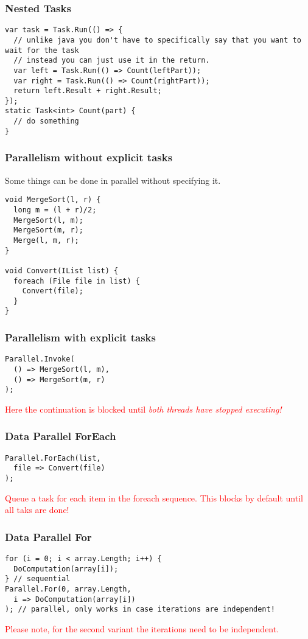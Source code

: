 \documentclass[main.tex,fontsize=8pt,paper=a4,paper=portrait,DIV=calc,]{scrartcl}
\begin{document}
\subsubsection{Nested Tasks}
\begin{lstlisting}
var task = Task.Run(() => {
  // unlike java you don't have to specifically say that you want to wait for the task
  // instead you can just use it in the return.
  var left = Task.Run(() => Count(leftPart));
  var right = Task.Run(() => Count(rightPart));
  return left.Result + right.Result;
});
static Task<int> Count(part) { 
  // do something
}
\end{lstlisting}

\subsubsection{Parallelism without explicit tasks}
Some things can be done in parallel without specifying it. 
\begin{lstlisting}
void MergeSort(l, r) {
  long m = (l + r)/2;
  MergeSort(l, m);
  MergeSort(m, r);
  Merge(l, m, r);
}

void Convert(IList list) {
  foreach (File file in list) {
    Convert(file);
  }
}
\end{lstlisting}

\subsubsection{Parallelism with explicit tasks}
\begin{lstlisting}
Parallel.Invoke(
  () => MergeSort(l, m),
  () => MergeSort(m, r)
);
\end{lstlisting}
\textcolor{red}{Here the continuation is blocked until \emph{both threads have stopped executing!}}

\subsubsection{Data Parallel ForEach}
\begin{lstlisting}
Parallel.ForEach(list,
  file => Convert(file)
);
\end{lstlisting}
\textcolor{red}{Queue a task for each item in the foreach sequence. This blocks by default until all taks are done!}

\subsubsection{Data Parallel For}
\begin{lstlisting}
for (i = 0; i < array.Length; i++) {
  DoComputation(array[i]);
} // sequential
Parallel.For(0, array.Length,
  i => DoComputation(array[i])
); // parallel, only works in case iterations are independent!
\end{lstlisting}
\textcolor{red}{Please note, for the second variant the iterations need to be independent.}
\end{document}
